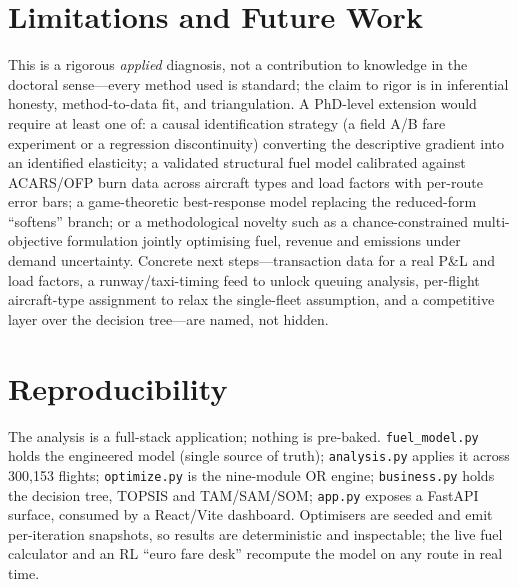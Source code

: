 \documentclass[conference]{IEEEtran}
\begin{document}
\section{Limitations and Future Work}
This is a rigorous \emph{applied} diagnosis, not a contribution to knowledge in the doctoral sense---every method used is standard; the claim to rigor is in inferential honesty, method-to-data fit, and triangulation. A PhD-level extension would require at least one of: a causal identification strategy (a field A/B fare experiment or a regression discontinuity) converting the descriptive gradient into an identified elasticity; a validated structural fuel model calibrated against ACARS/OFP burn data across aircraft types and load factors with per-route error bars; a game-theoretic best-response model replacing the reduced-form ``softens'' branch; or a methodological novelty such as a chance-constrained multi-objective formulation jointly optimising fuel, revenue and emissions under demand uncertainty. Concrete next steps---transaction data for a real P\&L and load factors, a runway/taxi-timing feed to unlock queuing analysis, per-flight aircraft-type assignment to relax the single-fleet assumption, and a competitive layer over the decision tree---are named, not hidden.

\section{Reproducibility}
The analysis is a full-stack application; nothing is pre-baked. \texttt{fuel\_model.py} holds the engineered model (single source of truth); \texttt{analysis.py} applies it across 300{,}153 flights; \texttt{optimize.py} is the nine-module OR engine; \texttt{business.py} holds the decision tree, TOPSIS and TAM/SAM/SOM; \texttt{app.py} exposes a FastAPI surface, consumed by a React/Vite dashboard. Optimisers are seeded and emit per-iteration snapshots, so results are deterministic and inspectable; the live fuel calculator and an RL ``euro fare desk'' recompute the model on any route in real time.

\end{document}
